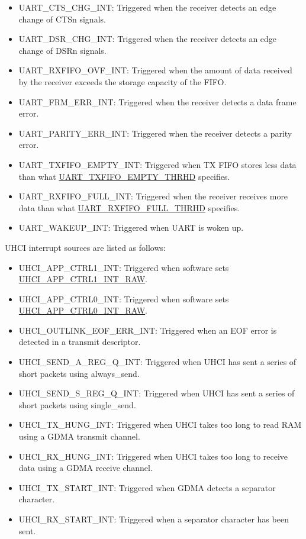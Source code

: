 \documentclass[main\_\_EN.tex]{subfiles}
\begin{document}
\begin{itemize}
\item \label{int:UARTCTSCHGINT}UART\_CTS\_CHG\_INT: Triggered when the receiver detects an edge change of CTSn signals.
\item \label{int:UARTDSRCHGINT}UART\_DSR\_CHG\_INT: Triggered when the receiver detects an edge change of DSRn signals.
\item \label{int:UARTRXFIFOOVFINT}UART\_RXFIFO\_OVF\_INT: Triggered when the amount of data received by the receiver exceeds the storage capacity of the FIFO.
\item \label{int:UARTFRMERRINT}UART\_FRM\_ERR\_INT: Triggered when the receiver detects a data frame error.
\item \label{int:UARTPARITYERRINT}UART\_PARITY\_ERR\_INT: Triggered when the receiver detects a parity error.
\item \label{int:UARTTXFIFOEMPTYINT}UART\_TXFIFO\_EMPTY\_INT: Triggered when TX FIFO stores less data than what \hyperref[fielddesc:UARTTXFIFOEMPTYTHRHD]{UART\_TXFIFO\_EMPTY\_THRHD} specifies.
\item \label{int:UARTRXFIFOFULLINT}UART\_RXFIFO\_FULL\_INT: Triggered when the receiver receives more data than what \hyperref[fielddesc:UARTRXFIFOFULLTHRHD]{UART\_RXFIFO\_FULL\_THRHD} specifies.
\item \label{int:UARTWAKEUPINT}UART\_WAKEUP\_INT: Triggered when UART is woken up.
\end{itemize}

UHCI interrupt sources are listed as follows:

\begin{itemize}
\item \label{int:UHCIAPPCTRL1INT}UHCI\_APP\_CTRL1\_INT: Triggered when software sets \hyperref[fielddesc:UHCIAPPCTRL1INTRAW]{UHCI\_APP\_CTRL1\_INT\_RAW}.
\item \label{int:UHCIAPPCTRL0INT}UHCI\_APP\_CTRL0\_INT: Triggered when software sets \hyperref[fielddesc:UHCIAPPCTRL0INTRAW]{UHCI\_APP\_CTRL0\_INT\_RAW}.
\item \label{int:UHCIOUTLINKEOFERRINT}UHCI\_OUTLINK\_EOF\_ERR\_INT: Triggered when an EOF error is detected in a transmit descriptor.
\item \label{int:UHCISENDAREGQINT}UHCI\_SEND\_A\_REG\_Q\_INT: Triggered when UHCI has sent a series of short packets using always\_send.
\item \label{int:UHCISENDSREGQINT}UHCI\_SEND\_S\_REG\_Q\_INT: Triggered when UHCI has sent a series of short packets using single\_send.
\item \label{int:UHCITXHUNGINT}UHCI\_TX\_HUNG\_INT: Triggered when UHCI takes too long to read RAM using a GDMA transmit channel.
\item \label{int:UHCIRXHUNGINT}UHCI\_RX\_HUNG\_INT: Triggered when UHCI takes too long to receive data using a GDMA receive channel.
\item \label{int:UHCITXSTARTINT}UHCI\_TX\_START\_INT: Triggered when GDMA detects a separator character.
\item \label{int:UHCIRXSTARTINT}UHCI\_RX\_START\_INT: Triggered when a separator character has been sent.
\end{itemize}
\end{document}
